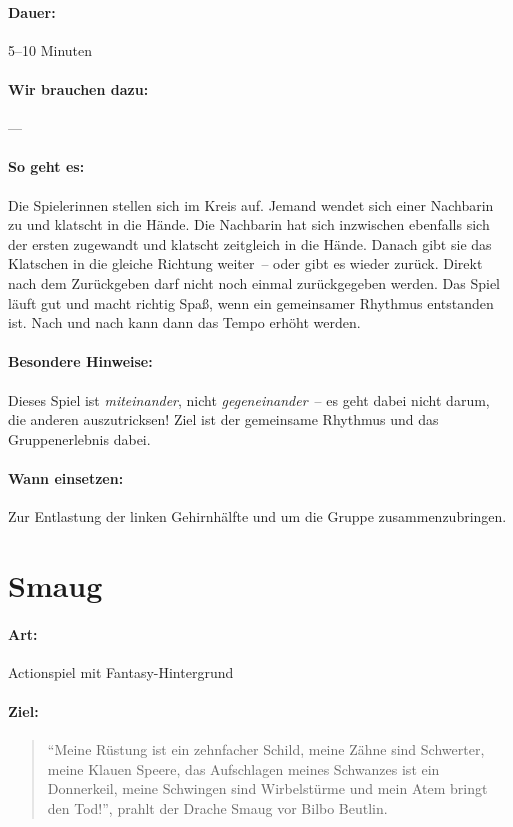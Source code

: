 \paragraph{Dauer:} 5--10 Minuten
\paragraph{Wir brauchen dazu:} ---
\paragraph{So geht es:} Die Spielerinnen stellen sich im Kreis auf. Jemand wendet sich einer Nachbarin zu und klatscht in die Hände. Die Nachbarin hat sich inzwischen ebenfalls sich der ersten zugewandt und klatscht zeitgleich in die Hände. Danach gibt sie das Klatschen in die gleiche Richtung weiter~-- oder gibt es wieder zurück. Direkt nach dem Zurückgeben darf nicht noch einmal zurückgegeben werden. Das Spiel läuft gut und macht richtig Spaß, wenn ein gemeinsamer Rhythmus entstanden ist. Nach und nach kann dann das Tempo erhöht werden.
\paragraph{Besondere Hinweise:} Dieses Spiel ist \emph{miteinander}, nicht \emph{gegeneinander}~-- es geht dabei nicht darum, die anderen auszutricksen! Ziel ist der gemeinsame Rhythmus und das Gruppenerlebnis dabei.
\paragraph{Wann einsetzen:} Zur Entlastung der linken Gehirnhälfte und um die Gruppe zusammenzubringen.

\section{Smaug}
\paragraph{Art:} Actionspiel mit Fantasy-Hintergrund
\paragraph{Ziel:}
\begin{quote}
	"`Meine Rüstung ist ein zehnfacher Schild, meine Zähne sind Schwerter, meine Klauen Speere, das Aufschlagen meines Schwanzes ist ein Donnerkeil, meine Schwingen sind Wirbelstürme und mein Atem bringt den Tod!"', prahlt der Drache Smaug vor Bilbo Beutlin.
\end{quote}

